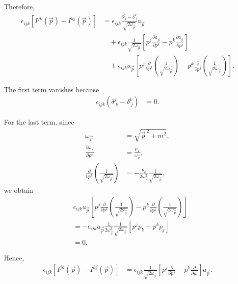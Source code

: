\documentclass{article}
\begin{document}
Therefore,
\begin{equation}
\begin{split}
\epsilon_{ijk}
\left[
I^{jk}(\vec p)-I^{kj}(\vec p)
\right]
&=
\epsilon_{ijk}
\frac{\delta^j_{\ k}-\delta^k_{\ j}}{\sqrt{2\omega_{\vec p}}}
a_{\vec p}
\\
&\quad
+
\epsilon_{ijk}
\frac{1}{\sqrt{2\omega_{\vec p}}}
\left[
p^j\frac{\partial a_{\vec p}}{\partial p^k}
-
p^k\frac{\partial a_{\vec p}}{\partial p^j}
\right]
\\
&\quad
+
\epsilon_{ijk}a_{\vec p}
\left[
p^j
\frac{\partial}{\partial p^k}
\left(
\frac{1}{\sqrt{2\omega_{\vec p}}}
\right)
-
p^k
\frac{\partial}{\partial p^j}
\left(
\frac{1}{\sqrt{2\omega_{\vec p}}}
\right)
\right].
\end{split}
\end{equation}

The first term vanishes because
\begin{equation}
\begin{split}
\epsilon_{ijk}
\left(
\delta^j_{\ k}-\delta^k_{\ j}
\right)
&=0.
\end{split}
\end{equation}

For the last term, since
\begin{equation}
\begin{split}
\omega_{\vec p}
&=
\sqrt{\vec p^{\,2}+m^2},
\\
\frac{\partial\omega_{\vec p}}{\partial p^k}
&=
\frac{p_k}{\omega_{\vec p}},
\\
\frac{\partial}{\partial p^k}
\left(
\frac{1}{\sqrt{2\omega_{\vec p}}}
\right)
&=
-\frac{p_k}{2\omega_{\vec p}^2}
\frac{1}{\sqrt{2\omega_{\vec p}}},
\end{split}
\end{equation}
we obtain
\begin{equation}
\begin{split}
&\epsilon_{ijk}a_{\vec p}
\left[
p^j
\frac{\partial}{\partial p^k}
\left(
\frac{1}{\sqrt{2\omega_{\vec p}}}
\right)
-
p^k
\frac{\partial}{\partial p^j}
\left(
\frac{1}{\sqrt{2\omega_{\vec p}}}
\right)
\right]
\\
&=
-\epsilon_{ijk}a_{\vec p}
\frac{1}{2\omega_{\vec p}^2}
\frac{1}{\sqrt{2\omega_{\vec p}}}
\left[
p^j p_k-p^k p_j
\right]
\\
&=0.
\end{split}
\end{equation}

Hence,
\begin{equation}
\begin{split}
\epsilon_{ijk}
\left[
I^{jk}(\vec p)-I^{kj}(\vec p)
\right]
&=
\epsilon_{ijk}
\frac{1}{\sqrt{2\omega_{\vec p}}}
\left[
p^j\frac{\partial}{\partial p^k}
-
p^k\frac{\partial}{\partial p^j}
\right]a_{\vec p}.
\end{split}
\end{equation}
\end{document}
